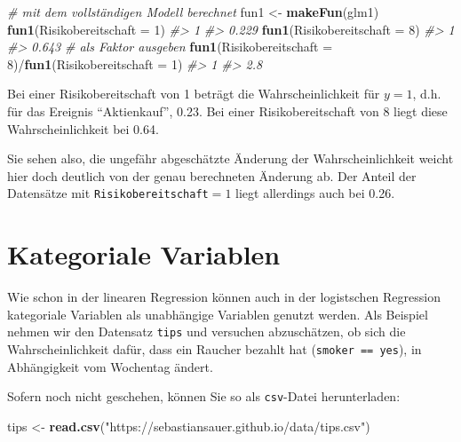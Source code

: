 \documentclass[12pt,]{book}
\makeatletter
\newenvironment{Shaded}{\begin{snugshade}}{\end{snugshade}}
\newcommand{\KeywordTok}[1]{\textcolor[rgb]{0.13,0.29,0.53}{\textbf{{#1}}}}
\newcommand{\DataTypeTok}[1]{\textcolor[rgb]{0.13,0.29,0.53}{{#1}}}
\newcommand{\DecValTok}[1]{\textcolor[rgb]{0.00,0.00,0.81}{{#1}}}
\newcommand{\StringTok}[1]{\textcolor[rgb]{0.31,0.60,0.02}{{#1}}}
\newcommand{\CommentTok}[1]{\textcolor[rgb]{0.56,0.35,0.01}{\textit{{#1}}}}
\newcommand{\NormalTok}[1]{{#1}}
\newenvironment{kframe}{%
\medskip{}
\setlength{\fboxsep}{.8em}
 \def\at@end@of@kframe{}%
 \ifinner\ifhmode%
  \def\at@end@of@kframe{\end{minipage}}%
  \begin{minipage}{\columnwidth}%
 \fi\fi%
 \def\FrameCommand##1{\hskip\@totalleftmargin \hskip-\fboxsep
 \colorbox{shadecolor}{##1}\hskip-\fboxsep
     \hskip-\linewidth \hskip-\@totalleftmargin \hskip\columnwidth}%
 \MakeFramed {\advance\hsize-\width
   \@totalleftmargin\z@ \linewidth\hsize
   \@setminipage}}%
 {\par\unskip\endMakeFramed%
 \at@end@of@kframe}
\renewenvironment{Shaded}{\begin{kframe}}{\end{kframe}}
\makeatother
\begin{document}
\begin{Shaded}
\begin{Highlighting}[]

\CommentTok{# mit dem vollständigen Modell berechnet}
\NormalTok{fun1 <-}\StringTok{ }\KeywordTok{makeFun}\NormalTok{(glm1)}
\KeywordTok{fun1}\NormalTok{(}\DataTypeTok{Risikobereitschaft =} \DecValTok{1}\NormalTok{)}
\CommentTok{#>     1 }
\CommentTok{#> 0.229}
\KeywordTok{fun1}\NormalTok{(}\DataTypeTok{Risikobereitschaft =} \DecValTok{8}\NormalTok{)}
\CommentTok{#>     1 }
\CommentTok{#> 0.643}
\CommentTok{# als Faktor ausgeben}
\KeywordTok{fun1}\NormalTok{(}\DataTypeTok{Risikobereitschaft =} \DecValTok{8}\NormalTok{)/}\KeywordTok{fun1}\NormalTok{(}\DataTypeTok{Risikobereitschaft =} \DecValTok{1}\NormalTok{)}
\CommentTok{#>   1 }
\CommentTok{#> 2.8}
\end{Highlighting}
\end{Shaded}

Bei einer Risikobereitschaft von 1 beträgt die Wahrscheinlichkeit für
\(y=1\), d.h. für das Ereignis ``Aktienkauf'', 0.23. Bei einer
Risikobereitschaft von 8 liegt diese Wahrscheinlichkeit bei 0.64.

Sie sehen also, die ungefähr abgeschätzte Änderung der
Wahrscheinlichkeit weicht hier doch deutlich von der genau berechneten
Änderung ab. Der Anteil der Datensätze mit
\texttt{Risikobereitschaft}\(=1\) liegt allerdings auch bei 0.26.

\section{Kategoriale Variablen}\label{kategoriale-variablen}

Wie schon in der linearen Regression können auch in der logistschen
Regression kategoriale Variablen als unabhängige Variablen genutzt
werden. Als Beispiel nehmen wir den Datensatz \texttt{tips} und
versuchen abzuschätzen, ob sich die Wahrscheinlichkeit dafür, dass ein
Raucher bezahlt hat (\texttt{smoker\ ==\ yes}), in Abhängigkeit vom
Wochentag ändert.

Sofern noch nicht geschehen, können Sie so als \texttt{csv}-Datei
herunterladen:

\begin{Shaded}
\begin{Highlighting}[]
\NormalTok{tips <-}\StringTok{ }\KeywordTok{read.csv}\NormalTok{(}\StringTok{"https://sebastiansauer.github.io/data/tips.csv"}\NormalTok{)}
\end{Highlighting}
\end{Shaded}
\end{document}
